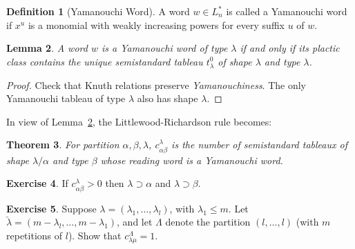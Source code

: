 \documentclass[11pt]{amsproc}
\newtheorem{theorem}{Theorem}[subsection]
\newtheorem{lemma}[theorem]{Lemma}
\theoremstyle{definition}
\newtheorem{definition}[theorem]{Definition}
\theoremstyle{example}
\newtheorem{exercise}[theorem]{Exercise}
\begin{document}
\begin{definition}
  [Yamanouchi Word]
  A word $w\in L_n^*$ is called a Yamanouchi word if $x^u$ is a monomial with weakly increasing powers for every suffix $u$ of $w$.
\end{definition}
\begin{lemma}
  \label{lemma:yamanouchi}
  A word $w$ is a Yamanouchi word of type $\lambda$ if and only if its plactic class contains the unique semistandard tableau $t^0_\lambda$ of shape $\lambda$ and type $\lambda$.
\end{lemma}
\begin{proof}
  Check that Knuth relations preserve \emph{Yamanouchiness}.
  The only Yamanouchi tableau of type $\lambda$ also has shape $\lambda$.
\end{proof}
In view of Lemma~\ref{lemma:yamanouchi}, the Littlewood-Richardson rule becomes:
\begin{theorem}
  For partition $\alpha,\beta,\lambda$, $c^\lambda_{\alpha\beta}$ is the number of semistandard tableaux of shape $\lambda/\alpha$ and type $\beta$ whose reading word is a Yamanouchi word.
\end{theorem}
\begin{exercise}
  If $c^\lambda_{\alpha\beta}>0$ then $\lambda\supset \alpha$ and $\lambda\supset \beta$.
\end{exercise}
\begin{exercise}
  Suppose $\lambda=(\lambda_1,\dotsc,\lambda_l)$, with $\lambda_1\leq m$.
  Let $\check\lambda=(m-\lambda_l,\dotsc,m-\lambda_1)$, and let $\Lambda$ denote the partition $(l,\dotsc,l)$ (with $m$ repetitions of $l$).
  Show that $c^\Lambda_{\lambda\mu}=1$.
\end{exercise}
\end{document}
